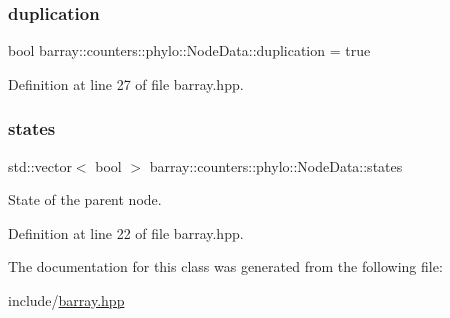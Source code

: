 \subsubsection{\texorpdfstring{duplication}{duplication}}
{\footnotesize\ttfamily bool barray\+::counters\+::phylo\+::\+Node\+Data\+::duplication = true}



Definition at line 27 of file barray.\+hpp.

\mbox{\label{classbarray_1_1counters_1_1phylo_1_1_node_data_a2f22473266c1ef55e66bab1288d9efd3}} 
\subsubsection{\texorpdfstring{states}{states}}
{\footnotesize\ttfamily std\+::vector$<$ bool $>$ barray\+::counters\+::phylo\+::\+Node\+Data\+::states}

State of the parent node. 

Definition at line 22 of file barray.\+hpp.



The documentation for this class was generated from the following file\+:\begin{DoxyCompactItemize}
\item 
include/\hyperlink{barray_8hpp}{barray.\+hpp}\end{DoxyCompactItemize}
